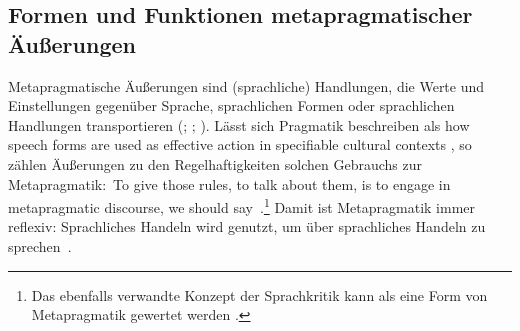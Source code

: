 \subsection{Formen und Funktionen metapragmatischer Äußerungen}
\label{sec:MetapragmatischeAeusserungen}
Metapragmatische Äußerungen sind (sprachliche) Handlungen, die Werte und Einstellungen gegenüber Sprache, sprachlichen Formen oder sprachlichen Handlungen transportieren (\citealp[s.][33]{Silverstein1993}; \citealp[264]{Spitzmuller2013}; \citealp[323--324]{Spitzmuller2014}). 
Lässt sich Pragmatik beschreiben als {\glqq}how speech forms are used as effective action in specifiable cultural contexts{\grqq} \citep[3]{Silverstein.1981}, so zählen {\"A}u{\ss}erungen zu den Regelhaftigkeiten solchen Gebrauchs zur Metapragmatik:~{\glqq}To give those rules, to talk about them, is to engage in {\glq}metapragmatic{\grq} discourse, we should say{\grqq}~\citep[3--4]{Silverstein.1981}.\footnote{Das ebenfalls verwandte Konzept der Sprachkritik kann als eine Form von Metapragmatik gewertet werden \citep[s.][3]{Schiewe.2005}.} 
Damit ist Metapragmatik immer reflexiv: Sprachliches Handeln wird genutzt, um über sprachliches Handeln zu sprechen~\citep[s.][116]{Gal.2016}. 

